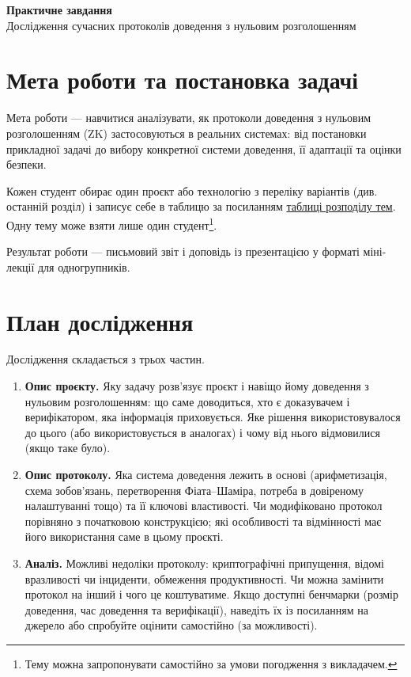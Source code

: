\documentclass{../../test-template}
\newcommand{\tablelink}{\href{https://docs.google.com/spreadsheets/d/1JiSbx1sBKMNnKzc8RCL8gHOllW0FGwNVWB05o250l_k/edit?usp=sharing}{таблиці розподілу тем}}
\begin{document}
\begin{center}
    \textbf{\Huge{Практичне завдання}} \\[4pt]
    \large Дослідження сучасних протоколів доведення з нульовим розголошенням
\end{center}

\section*{Мета роботи та постановка задачі}

Мета роботи --- навчитися аналізувати, як протоколи доведення з нульовим
розголошенням (ZK) застосовуються в реальних системах: від постановки
прикладної задачі до вибору конкретної системи доведення, її адаптації
та оцінки безпеки.

Кожен студент обирає один проєкт або технологію з переліку варіантів
(див. останній розділ) і записує себе в таблицю за посиланням \tablelink.
Одну тему може взяти лише один студент\footnote{Тему можна запропонувати
самостійно за умови погодження з викладачем.}.

Результат роботи --- письмовий звіт і доповідь із презентацією у форматі
міні-лекції для одногрупників.

\section*{План дослідження}

Дослідження складається з трьох частин.

\begin{enumerate}
    \item \textbf{Опис проєкту.} Яку задачу розв'язує проєкт і навіщо йому
    доведення з нульовим розголошенням: що саме доводиться, хто є доказувачем
    і верифікатором, яка інформація приховується. Яке рішення
    використовувалося до цього (або використовується в аналогах) і чому
    від нього відмовилися (якщо таке було).

    \item \textbf{Опис протоколу.} Яка система доведення лежить в основі
    (арифметизація, схема зобов'язань, перетворення Фіата--Шаміра, потреба
    в довіреному налаштуванні тощо) та її ключові властивості. Чи модифіковано
    протокол порівняно з початковою конструкцією; які особливості та відмінності
    має його використання саме в цьому проєкті.

    \item \textbf{Аналіз.} Можливі недоліки протоколу: криптографічні
    припущення, відомі вразливості чи інциденти, обмеження продуктивності.
    Чи можна замінити протокол на інший і чого це коштуватиме.
    Якщо доступні бенчмарки (розмір доведення, час доведення та верифікації),
    наведіть їх із посиланням на джерело або спробуйте оцінити самостійно (за можливості).
\end{enumerate}
\end{document}
